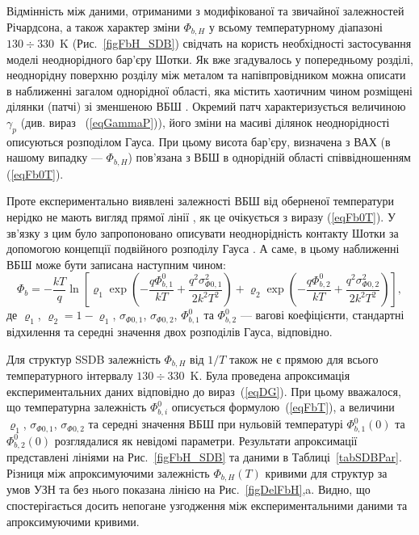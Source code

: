 \documentclass[a4paper,14pt,oneside,openany]{memoir}
\begin{document}
Відмінність між даними, отриманими з модифікованої та звичайної залежностей Річардсона,
а також характер зміни $\Phi_{b,H}$ у всьому температурному діапазоні $130\div330$~K (Рис.~\ref{figFbH_SDB})
свідчать на користь необхідності застосування моделі неоднорідного бар'єру Шотки.
Як вже згадувалось у попередньому розділі,
неоднорідну поверхню розділу між металом та напівпровідником можна описати в наближенні загалом однорідної області,
яка містить хаотичним чином розміщені ділянки (патчі) зі зменшеною ВБШ \cite{Tung:PhysRev,Tung:MSE}.
Окремий патч характеризується величиною $\gamma_p$ (див. вираз ~(\ref{eqGammaP})),
його зміни на масиві ділянок неоднорідності описуються розподілом Гауса.
При цьому висота бар'єру, визначена з ВАХ (в нашому випадку --- $\Phi_{b,H}$) пов'язана з ВБШ в однорідній області співвідношенням (\ref{eqFb0T}).

Проте експериментально виявлені залежності ВБШ від оберненої температури нерідко не мають вигляд прямої лінії \cite{KumarJAP2012,Tascioglu2010,Jiang:DG,Yildirima:DG,Jiang:DGJap},
як це очікується з виразу (\ref{eqFb0T}).
У зв'язку з цим було запропоновано описувати неоднорідність контакту Шотки за допомогою концепції подвійного розподілу Гауса \cite{Jiang:DG,Yildirima:DG,Jiang:DGJap}.
А саме, в цьому наближенні ВБШ може бути записана наступним чином:
\begin{equation}
\label{eqDG}
  \Phi_b=-\frac{kT}{q}\ln\left[\varrho_1\exp\left(-\frac{q\Phi_{b,1}^0}{kT}+
  \frac{q^2\sigma^2_{\Phi0,1}}{2k^2T^2}\right)
   +
  \varrho_2\exp\left(-\frac{q\Phi_{b,2}^{0}}{kT}+
  \frac{q^2\sigma^2_{\Phi0,2}}{2k^2T^2}\right)\right],
\end{equation}
де
$\varrho_1$, $\varrho_2=1-\varrho_1$, $\sigma_{\Phi0,1}$, $\sigma_{\Phi0,2}$, $\Phi_{b,1}^0$ та $\Phi_{b,2}^0$ ---
вагові коефіцієнти, стандартні відхилення та середні значення двох розподілів Гауса, відповідно.

Для структур SSDB залежність $\Phi_{b,H}$ від $1/T$ також не є прямою для всього температурного інтервалу $130\div330$~K.
Була проведена апроксимація експериментальних даних відповідно до вираз~(\ref{eqDG}).
При цьому вважалося, що температурна залежність $\Phi_{b,i}^0$ описується формулою~(\ref{eqFbT}), а величини
$\varrho_1$, $\sigma_{\Phi0,1}$, $\sigma_{\Phi0,2}$ та середні значення ВБШ при нульовій температурі $\Phi_{b,1}^0(0)$ та $\Phi_{b,2}^0(0)$
розглядалися як невідомі параметри.
Результати апроксимації представлені лініями на Рис.~\ref{figFbH_SDB} та даними в Таблиці~\ref{tabSDBPar}.
Різниця між апроксимуючими залежність $\Phi_{b,H}(T)$ кривими для структур за умов УЗН та без нього
показана лінією на Рис.~\ref{figDelFbH},a.
Видно, що спостерігається досить непогане узгодження між експериментальними даними та апроксимуючими кривими.
\end{document}
